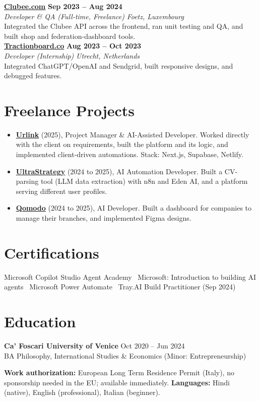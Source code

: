 \documentclass[a4paper,10pt]{article}
\newcommand{\role}[4]{%
 \textbf{#1} \hfill \textbf{#2}\\[1pt]%
 \textit{#3} \hfill \textit{#4}\\[2pt]%
}
\begin{document}
\role{\href{https://clubee.com}{Clubee.com}}{Sep 2023 -- Aug 2024}{Developer \& QA (Full-time, Freelance)}{Foetz, Luxembourg}
Integrated the Clubee API across the frontend, ran unit testing and QA, and built shop and federation-dashboard tools.\\[1pt]

\role{\href{https://tractionboard.co}{Tractionboard.co}}{Aug 2023 -- Oct 2023}{Developer (Internship)}{Utrecht, Netherlands}
Integrated ChatGPT/OpenAI and Sendgrid, built responsive designs, and debugged features.

\section{Freelance Projects}
\begin{itemize}
 \item \textbf{\href{https://smarturlink.com/}{Urlink}} (2025), Project Manager \& AI-Assisted Developer. Worked directly with the client on requirements, built the platform and its logic, and implemented client-driven automations. Stack: Next.js, Supabase, Netlify.
 \item \textbf{\href{https://ultrastrategy.com}{UltraStrategy}} (2024 to 2025), AI Automation Developer. Built a CV-parsing tool (LLM data extraction) with n8n and Eden AI, and a platform serving different user profiles.
 \item \textbf{\href{https://www.qomodo.me/}{Qomodo}} (2024 to 2025), AI Developer. Built a dashboard for companies to manage their branches, and implemented Figma designs.
\end{itemize}

\section{Certifications}
Microsoft Copilot Studio Agent Academy \textbullet\ Microsoft: Introduction to building AI agents \textbullet\ Microsoft Power Automate \textbullet\ Tray.AI Build Practitioner (Sep 2024)

\section{Education}
\textbf{Ca' Foscari University of Venice} \hfill Oct 2020 -- Jun 2024\\
BA Philosophy, International Studies \& Economics (Minor: Entrepreneurship)

\vspace{2pt}
{\small \textbf{Work authorization:} European Long Term Residence Permit (Italy), no sponsorship needed in the EU; available immediately. \quad \textbf{Languages:} Hindi (native), English (professional), Italian (beginner).}
\end{document}
